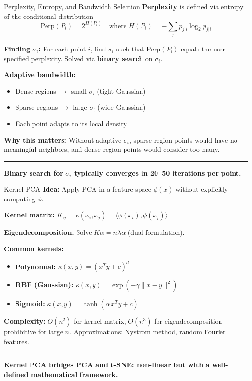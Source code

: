 \documentclass[8pt,aspectratio=169]{beamer}
\newcommand{\bottomnote}[1]{%
\vfill
\vspace{-2mm}
\textcolor{mllavender2}{\rule{\textwidth}{0.4pt}}
\vspace{1mm}
\footnotesize
\textbf{#1}
}
\begin{document}
\begin{frame}[t]{Perplexity, Entropy, and Bandwidth Selection}
\textbf{Perplexity} is defined via entropy of the conditional distribution:
\[
\text{Perp}(P_i) = 2^{H(P_i)} \quad \text{where } H(P_i) = -\sum_{j} p_{j|i} \log_2 p_{j|i}
\]

\textbf{Finding $\sigma_i$:} For each point $i$, find $\sigma_i$ such that $\text{Perp}(P_i)$ equals the user-specified perplexity. Solved via \textbf{binary search} on $\sigma_i$.

\vspace{0.3em}
\textbf{Adaptive bandwidth:}
\begin{itemize}
  \item Dense regions $\rightarrow$ small $\sigma_i$ (tight Gaussian)
  \item Sparse regions $\rightarrow$ large $\sigma_i$ (wide Gaussian)
  \item Each point adapts to its local density
\end{itemize}

\vspace{0.3em}
\textbf{Why this matters:} Without adaptive $\sigma_i$, sparse-region points would have no meaningful neighbors, and dense-region points would consider too many.
\bottomnote{Binary search for $\sigma_i$ typically converges in 20--50 iterations per point.}
\end{frame}

\begin{frame}[t]{Kernel PCA}
\textbf{Idea:} Apply PCA in a feature space $\phi(x)$ without explicitly computing $\phi$.

\vspace{0.3em}
\textbf{Kernel matrix:} $K_{ij} = \kappa(x_i, x_j) = \langle \phi(x_i), \phi(x_j) \rangle$

\textbf{Eigendecomposition:} Solve $K \alpha = n\lambda \alpha$ (dual formulation).

\vspace{0.3em}
\textbf{Common kernels:}
\begin{itemize}
  \item \textbf{Polynomial:} $\kappa(x,y) = (x^Ty + c)^d$
  \item \textbf{RBF (Gaussian):} $\kappa(x,y) = \exp(-\gamma\|x-y\|^2)$
  \item \textbf{Sigmoid:} $\kappa(x,y) = \tanh(\alpha\, x^Ty + c)$
\end{itemize}

\vspace{0.3em}
\textbf{Complexity:} $O(n^2)$ for kernel matrix, $O(n^3)$ for eigendecomposition --- prohibitive for large $n$. Approximations: Nystrom method, random Fourier features.
\bottomnote{Kernel PCA bridges PCA and t-SNE: non-linear but with a well-defined mathematical framework.}
\end{frame}
\end{document}

